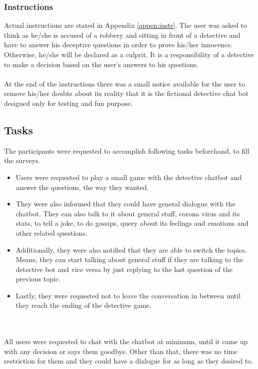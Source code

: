 \subsubsection*{Instructions}
Actual instructions are stated in Appendix \ref{appen:instr}. The user was asked to think as he/she is accused of a robbery and sitting in front of a detective and have to answer his deceptive questions in order to prove his/her innocence. Otherwise, he/she will be declared as a culprit. It is a responsibility of a detective to make a decision based on the user's answers to his questions.
\\~\\
At the end of the instructions there was a small notice available for the user to remove his/her doubts about its reality that it is the fictional detective chat bot designed only for testing and fun purpose.

\subsection{Tasks}
The participants were requested to accomplish following tasks beforehand, to fill the surveys.
\begin{itemize}
    \item Users were requested to play a small game with the detective chatbot and answer the questions, the way they wanted.
    \item They were also informed that they could have general dialogue with the chatbot. They can also talk to it about general stuff, corona virus and its stats, to tell a joke, to do gossips, query about its feelings and emotions and other related questions.
    \item Additionally, they were also notified that they are able to switch the topics. Means, they can start talking about general stuff if they are talking to the detective bot and vice versa by just replying to the last question of the previous topic.
    \item Lastly, they were requested not to leave the conversation in between until they reach the ending of the detective game. 
\end{itemize} 
\\~\\
All users were requested to chat with the chatbot at minimum, until it came up with any decision or says them goodbye. Other than that, there was no time restriction for them and they could have a dialogue for as long as they desired to.

